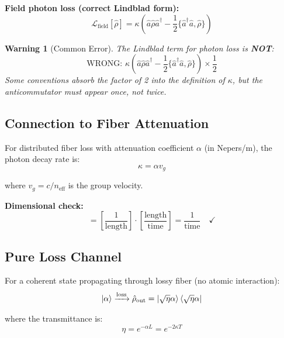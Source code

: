 \documentclass[12pt,a4paper]{article}
\newtheorem{warning}{Warning}
\begin{document}
\textbf{Field photon loss (correct Lindblad form):}
\begin{equation}
\mathcal{L}_{\text{field}}[\hat{\rho}] = \kappa\left(\hat{a} \hat{\rho} \hat{a}^\dagger - \frac{1}{2}\{\hat{a}^\dagger \hat{a}, \hat{\rho}\}\right) \label{eq:Lindblad_field}
\end{equation}

\begin{warning}[Common Error]
The Lindblad term for photon loss is \textbf{NOT}:
\begin{equation}
\text{WRONG: } \kappa\left(\hat{a} \hat{\rho} \hat{a}^\dagger - \frac{1}{2}\{\hat{a}^\dagger \hat{a}, \hat{\rho}\}\right) \times \frac{1}{2}
\end{equation}
Some conventions absorb the factor of 2 into the definition of $\kappa$, but the anticommutator must appear once, not twice.
\end{warning}

\subsection{Connection to Fiber Attenuation}

For distributed fiber loss with attenuation coefficient $\alpha$ (in Nepers/m), the photon decay rate is:
\begin{equation}
\kappa = \alpha v_g \label{eq:kappa_fiber}
\end{equation}

where $v_g = c/n_{\text{eff}}$ is the group velocity.

\textbf{Dimensional check:}
\begin{equation}
[\kappa] = \left[\frac{1}{\text{length}}\right] \cdot \left[\frac{\text{length}}{\text{time}}\right] = \frac{1}{\text{time}} \quad \checkmark
\end{equation}

\subsection{Pure Loss Channel}

For a coherent state propagating through lossy fiber (no atomic interaction):
\begin{equation}
\ket{\alpha} \xrightarrow{\text{loss}} \hat{\rho}_{\text{out}} = \ket{\sqrt{\eta}\alpha}\bra{\sqrt{\eta}\alpha}
\end{equation}

where the transmittance is:
\begin{equation}
\eta = e^{-\alpha L} = e^{-2\kappa T} \label{eq:transmittance}
\end{equation}
\end{document}
